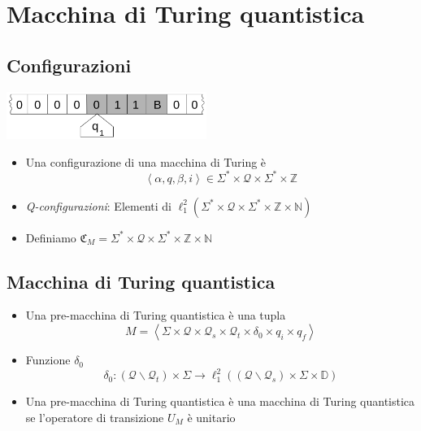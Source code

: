 \documentclass{beamer}
\begin{document}
\section{Macchina di Turing quantistica}

\subsection{Configurazioni}

\begin{frame}{\subsecname}{}
	\centering\includegraphics[width=6.5cm]{Turing_machine_2b.png}
	\begin{itemize}
		\item Una configurazione di una macchina di Turing è
		\[ \left \langle \alpha, q, \beta, i \right \rangle \in \Sigma^{*} \times \mathcal{Q} \times \Sigma^{*} \times \mathbb{Z} \]
		\item \textit{Q-configurazioni}: Elementi di \( \ell^{2}_{1} \left ( \Sigma^{*} \times \mathcal{Q} \times \Sigma^{*} \times \mathbb{Z} \times \mathbb{N} \right ) \)
		\item Definiamo \( \mathfrak{C}_M = \Sigma^{*} \times \mathcal{Q} \times \Sigma^{*} \times \mathbb{Z} \times \mathbb{N} \)
	\end{itemize}
\end{frame}

\subsection{Macchina di Turing quantistica}

\begin{frame}{\subsecname}{}
	\begin{itemize}
		\item Una pre-macchina di Turing quantistica è una tupla
		\[ M = \left \langle \Sigma \times \mathcal{Q} \times \mathcal{Q}_{s} \times \mathcal{Q}_{t} \times \delta_{0} \times q_{i} \times q_{f} \right \rangle \]
		\item Funzione \(\delta_{0}\)
		\[ \delta_{0} : \left ( \mathcal{Q} \backslash \mathcal{Q}_{t} \right ) \times \Sigma \rightarrow \ell^{2}_{1} \left ( \left ( \mathcal{Q} \backslash \mathcal{Q}_{s} \right ) \times \Sigma \times \mathbb{D} \right ) \]
		\item Una pre-macchina di Turing quantistica è una macchina di Turing quantistica se l'operatore di transizione \( U_{M} \) è unitario
	\end{itemize}
\end{frame}
\end{document}
